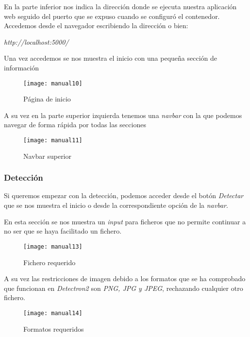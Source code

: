 En la parte inferior nos indica la dirección donde se ejecuta nuestra aplicación web seguido del puerto que se expuso cuando se configuró el contenedor. Accedemos desde el navegador escribiendo la dirección o bien:

\begin{center}\emph{http://localhost:5000/}\end{center}

Una vez accedemos se nos muestra el inicio con una pequeña sección de información

    \begin{figure}[htb]
	\centering
	\texttt{[image: manual10]}
	\caption[Página de inicio]{Página de inicio}
    \end{figure}

A su vez en la parte superior izquierda tenemos una \emph{navbar} con la que podemos navegar de forma rápida por todas las secciones

    \begin{figure}[htb]
	\centering
	\texttt{[image: manual11]}
	\caption[Navbar superior]{Navbar superior}
    \end{figure}

\clearpage

\subsubsection{Detección}
Si queremos empezar con la detección, podemos acceder desde el botón \emph{Detectar} que se nos muestra el inicio o desde la correspondiente opción de la \emph{navbar}.

En esta sección se nos muestra un \emph{input} para ficheros que no permite continuar a no ser que se haya facilitado un fichero.

    \begin{figure}[htb]
	\centering
	\texttt{[image: manual13]}
	\caption[Fichero requerido]{Fichero requerido}
    \end{figure}
    
A su vez las restricciones de imagen debido a los formatos que se ha comprobado que funcionan en \emph{Detectron2} son \emph{PNG, JPG y JPEG}, rechazando cualquier otro fichero.

    \begin{figure}[htb]
	\centering
	\texttt{[image: manual14]}
	\caption[Formatos requeridos]{Formatos requeridos}
    \end{figure}
    
